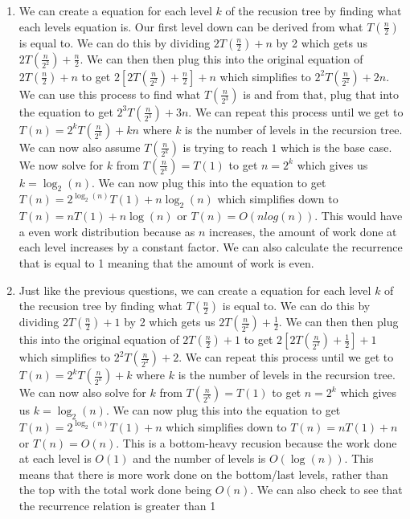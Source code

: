 \documentclass[12pt,letterpaper]{article}
\begin{document}
\begin{enumerate}
    \item We can create a equation for each level $k$ of the recusion tree by finding what each levels equation is. Our first level down 
    can be derived from what $T(\frac{n}{2})$ is equal to.
    We can do this by dividing $2T(\frac{n}{2})+n$ by 2 which gets us $2T(\frac{n}{2^2})+\frac{n}{2}$. We can then
    then plug this into the original equation of $2T(\frac{n}{2})+n$ to get $2[2T(\frac{n}{2^2}) + \frac{n}{2}] + n$ which
    simplifies to $2^2T(\frac{n}{2^2}) + 2n$. We can use this process to find what $T(\frac{n}{2^3})$ is and from that, plug that
    into the equation to get $2^3T(\frac{n}{2^3}) + 3n$. We can repeat this process until we get to $T(n) = 2^kT(\frac{n}{2^k}) + kn$
    where $k$ is the number of levels in the recursion tree. We can now also assume $T(\frac{n}{2^k})$ is trying to reach $1$ which is the base case.
    We now solve for $k$ from $T(\frac{n}{2^k}) = T(1)$ to get 
    $n = 2^k$ which gives us $k = \log_2(n)$. We can now plug this into the equation to get $T(n) = 2^{\log_2(n)}T(1) + n\log_2(n)$ which
    simplifies down to $T(n) = nT(1) + n\log(n)$ or $T(n) = O(nlog(n))$. This would have a even work distribution because as $n$ increases, the
    amount of work done at each level increases by a constant factor. We can also calculate the recurrence that is equal to 1 meaning that
    the amount of work is even.
    \item Just like the previous questions, we can create a equation for each level $k$ of the recusion tree by finding what $T(\frac{n}{2})$ is equal to.
    We can do this by dividing $2T(\frac{n}{2})+1$ by 2 which gets us $2T(\frac{n}{2^2})+\frac{1}{2}$. We can then
    then plug this into the original equation of $2T(\frac{n}{2})+1$ to get $2[2T(\frac{n}{2^2}) + \frac{1}{2}] + 1$ which
    simplifies to $2^2T(\frac{n}{2^2}) + 2$. We can repeat this process until we get to $T(n) = 2^kT(\frac{n}{2^k}) + k$
    where $k$ is the number of levels in the recursion tree. We can now also solve for $k$ from $T(\frac{n}{2^k}) = T(1)$ to get
    $n = 2^k$ which gives us $k = \log_2(n)$. We can now plug this into the equation to get $T(n) = 2^{\log_2(n)}T(1) + n$ which
    simplifies down to $T(n) = nT(1) + n$ or $T(n) = O(n)$. This is a bottom-heavy recusion because the work done at each
    level is $O(1)$ and the number of levels is $O(\log(n))$. This means that there is more work done on the bottom/last levels,
    rather than the top with the total work done being $O(n)$. We can also check to see that the recurrence relation is greater than 1

\end{enumerate}
\end{document}
